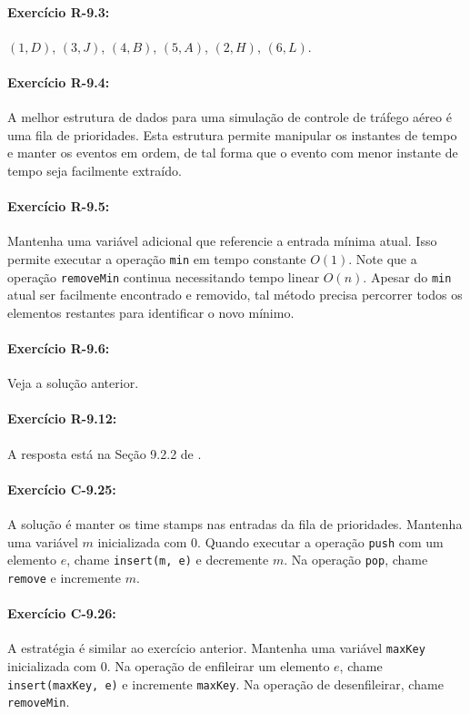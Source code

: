 \paragraph{Exercício R-9.3:}
$(1, D)$, $(3, J)$, $(4, B)$, $(5, A)$, $(2, H)$, $(6, L)$.

\paragraph{Exercício R-9.4:}
A melhor estrutura de dados para uma simulação de controle de tráfego aéreo é uma fila de prioridades. Esta estrutura permite manipular os instantes de tempo e manter os eventos em ordem, de tal forma que o evento com menor instante de tempo seja facilmente extraído.

\paragraph{Exercício R-9.5:}
Mantenha uma variável adicional que referencie a entrada mínima atual. Isso permite executar a operação \texttt{min} em tempo constante $O(1)$. Note que a operação \texttt{removeMin} continua necessitando tempo linear $O(n)$. Apesar do \texttt{min} atual ser facilmente encontrado e removido, tal método precisa percorrer todos os elementos restantes para identificar o novo mínimo.

\paragraph{Exercício R-9.6:}
Veja a solução anterior.

\paragraph{Exercício R-9.12:}
A resposta está na Seção 9.2.2 de \cite{GoodrichEtAl2014}.

\paragraph{Exercício C-9.25:}
A solução é manter os time stamps nas entradas da fila de prioridades. Mantenha uma variável $m$ inicializada com $0$. Quando executar a operação \texttt{push} com um elemento $e$, chame \texttt{insert(m,\,e)} e decremente $m$. Na operação \texttt{pop}, chame \texttt{remove} e incremente $m$.

\paragraph{Exercício C-9.26:}
A estratégia é similar ao exercício anterior. Mantenha uma variável \texttt{maxKey} inicializada com $0$. Na operação de enfileirar um elemento $e$, chame \texttt{insert(maxKey,\,e)} e incremente \texttt{maxKey}. Na operação de desenfileirar, chame \texttt{removeMin}.

